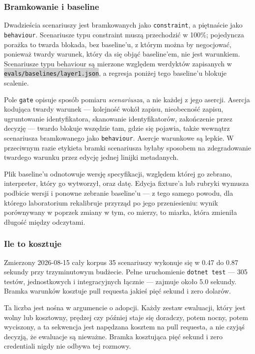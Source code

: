 \documentclass[11pt,a4paper]{article}
\newcommand{\repopath}[1]{\colorbox{lightgray}{\texttt{#1}}}
\begin{document}
\subsubsection*{Bramkowanie i baseline}

Dwadzieścia scenariuszy jest bramkowanych jako \texttt{constraint}, a piętnaście jako \texttt{behaviour}. Scenariusze typu constraint muszą przechodzić w 100\%; pojedyncza porażka to twarda blokada, bez baseline'u, z którym można by negocjować, ponieważ twardy warunek, który da się objąć baseline'em, nie jest warunkiem. Scenariusze typu behaviour są mierzone względem werdyktów zapisanych w \repopath{evals/baselines/layer1.json}, a regresja poniżej tego baseline'u blokuje scalenie.

Pole \texttt{gate} opisuje sposób pomiaru \emph{scenariusza}, a nie każdej z jego asercji. Asercja kodująca twardy warunek --- kolejność wokół zapisu, nieobecność zapisu, ugruntowanie identyfikatora, skanowanie identyfikatorów, zakończenie przez decyzję --- twardo blokuje wszędzie tam, gdzie się pojawia, także wewnątrz scenariusza bramkowanego jako \texttt{behaviour}. Asercje warunkowe są lepkie. W przeciwnym razie etykieta bramki scenariusza byłaby sposobem na zdegradowanie twardego warunku przez edycję jednej linijki metadanych.

Plik baseline'u odnotowuje wersję specyfikacji, względem której go zebrano, interpreter, który go wytworzył, oraz datę. Edycja fixture'a lub rubryki wymusza podbicie wersji i ponowne zebranie baseline'u --- z tego samego powodu, dla którego laboratorium rekalibruje przyrząd po jego przeniesieniu: wynik porównywany w poprzek zmiany w tym, co mierzy, to miarka, która zmieniła długość między odczytami.

\subsubsection*{Ile to kosztuje}

Zmierzony 2026-08-15 cały korpus 35 scenariuszy wykonuje się w 0.47 do 0.87 sekundy przy trzyminutowym budżecie. Pełne uruchomienie \texttt{dotnet test} --- 305 testów, jednostkowych i integracyjnych łącznie --- zajmuje około 5.0 sekundy. Bramka warunków kosztuje pull requesta jakieś pięć sekund i zero dolarów.

Ta liczba jest nośna w argumencie o adopcji. Każdy zestaw ewaluacji, który jest wolny lub kosztowny, prędzej czy później staje się doradczy, potem nocny, potem wyciszony, a ta sekwencja jest napędzana kosztem na pull requesta, a nie czyjąś decyzją, że ewaluacje są nieważne. Bramka kosztująca pięć sekund i zero credentiali nigdy nie odbywa tej rozmowy.
\end{document}
